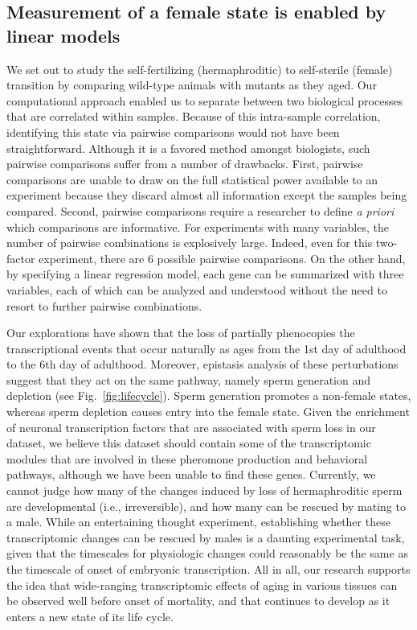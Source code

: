 \subsection*{Measurement of a female state is enabled by linear models}
\label{sub:female_state}

We set out to study the self-fertilizing (hermaphroditic) to self-sterile
(female) transition by comparing wild-type animals with \fog{} mutants as they
aged. Our computational approach enabled us to separate between two biological
processes that are correlated within samples. Because of this intra-sample
correlation, identifying this state via pairwise comparisons would not have been
straightforward. Although it is a favored method amongst biologists, such
pairwise comparisons suffer from a number of drawbacks.
First, pairwise comparisons are unable to draw on the full statistical power
available to an experiment because they discard almost all information except
the samples being compared. Second, pairwise comparisons require a researcher
to define \emph{a priori} which comparisons are informative. For experiments
with many variables, the number of pairwise combinations is explosively large.
Indeed, even for this two-factor experiment, there are 6 possible pairwise
comparisons. On the other hand, by specifying a linear regression model, each
gene can be summarized with three variables, each of which can be analyzed and
understood without the need to resort to further pairwise combinations.

Our explorations have shown that the loss of \fog{} partially phenocopies the
transcriptional events that occur naturally as \cel{} ages from the 1st day of
adulthood to the 6th day of adulthood. Moreover, epistasis analysis of these
perturbations suggest that they act on the same pathway, namely sperm generation
and depletion (see Fig.~\ref{fig:lifecycle}). Sperm generation promotes a non-female
states, whereas sperm depletion causes entry into the female state. Given the
enrichment of neuronal transcription factors that are associated with sperm loss
in our dataset, we believe this dataset should contain some of the transcriptomic
modules that are involved in these pheromone production and behavioral pathways,
although we have been unable to find these genes. Currently, we cannot judge how
many of the changes induced by loss of hermaphroditic sperm are developmental
(i.e., irreversible), and how many can be rescued by mating to a male.
While an entertaining thought experiment, establishing whether these transcriptomic
changes can be rescued by males is a daunting experimental task, given that the
timescales for physiologic changes could reasonably be the same as the timescale
of onset of embryonic transcription. All in all, our research supports the idea
that wide-ranging transcriptomic effects of aging in various tissues can be
observed well before onset of mortality, and that \cel{} continues to develop as
it enters a new state of its life cycle.

